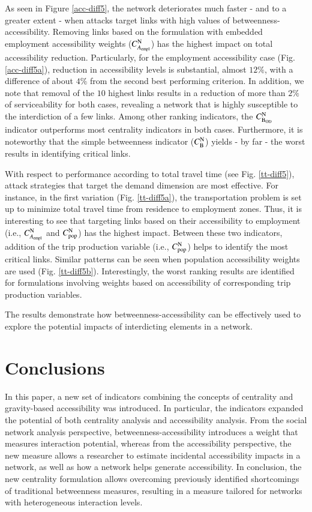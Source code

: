 \documentclass[]{elsarticle} %
\begin{document}
As seen in Figure \ref{acc-diff5}, the network deteriorates much faster
- and to a greater extent - when attacks target links with high values
of betweenness-accessibility. Removing links based on the formulation
with embedded employment accessibility weights
(\(C_{A_{\rm empl}}^{\rm N}\)) has the highest impact on total
accessibility reduction. Particularly, for the employment accessibility
case (Fig. \ref{acc-diff5a}), reduction in accessibility levels is
substantial, almost \(12\%\), with a difference of about \(4\%\) from
the second best performing criterion. In addition, we note that removal
of the \(10\) highest links results in a reduction of more than \(2\%\)
of serviceability for both cases, revealing a network that is highly
susceptible to the interdiction of a few links. Among other ranking
indicators, the \(C_{\rm B_{OD}}^{\rm N}\) indicator outperforms most
centrality indicators in both cases. Furthermore, it is noteworthy that
the simple betweenness indicator (\(C_{\rm B}^{\rm N}\)) yields - by far
- the worst results in identifying critical links.

With respect to performance according to total travel time (see Fig.
\ref{tt-diff5}), attack strategies that target the demand dimension are
most effective. For instance, in the first variation (Fig.
\ref{tt-diff5a}), the transportation problem is set up to minimize total
travel time from residence to employment zones. Thus, it is interesting
to see that targeting links based on their accessibility to employment
(i.e., \(C_{A_{\rm empl}}^{\rm N}\) and \(C_{\rm pop}^{\rm N}\)) has the
highest impact. Between these two indicators, addition of the trip
production variable (i.e., \(C_{\rm pop}^{\rm N}\)) helps to identify
the most critical links. Similar patterns can be seen when population
accessibility weights are used (Fig. \ref{tt-diff5b}). Interestingly,
the worst ranking results are identified for formulations involving
weights based on accessibility of corresponding trip production
variables.

The results demonstrate how betweenness-accessibility can be effectively
used to explore the potential impacts of interdicting elements in a
network.

\hypertarget{conclusions}{%
\section{Conclusions}\label{conclusions}}

In this paper, a new set of indicators combining the concepts of
centrality and gravity-based accessibility was introduced. In
particular, the indicators expanded the potential of both centrality
analysis and accessibility analysis. From the social network analysis
perspective, betweenness-accessibility introduces a weight that measures
interaction potential, whereas from the accessibility perspective, the
new measure allows a researcher to estimate incidental accessibility
impacts in a network, as well as how a network helps generate
accessibility. In conclusion, the new centrality formulation allows
overcoming previously identified shortcomings of traditional betweenness
measures, resulting in a measure tailored for networks with
heterogeneous interaction levels.
\end{document}
